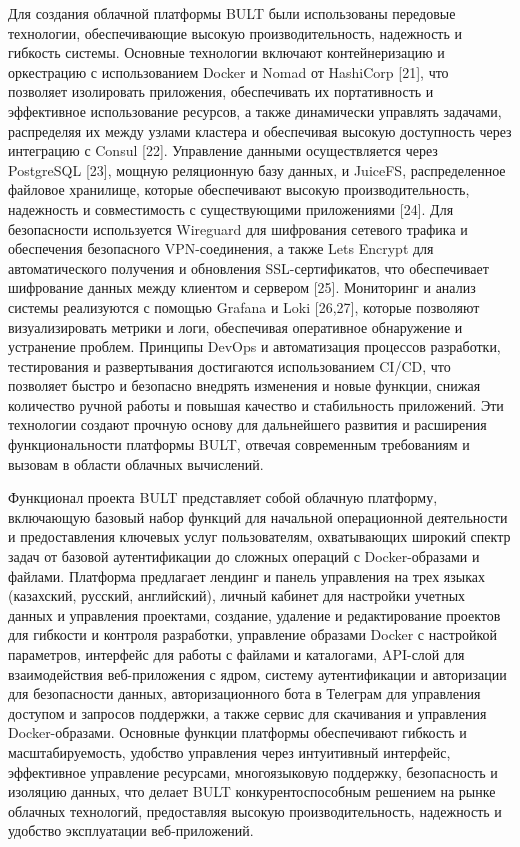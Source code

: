 \documentclass[
]{article}
\begin{document}
Для создания облачной платформы BULT были использованы передовые
технологии, обеспечивающие высокую производительность, надежность и
гибкость системы. Основные технологии включают контейнеризацию и
оркестрацию с использованием Docker и Nomad от HashiCorp {[}21{]}, что
позволяет изолировать приложения, обеспечивать их портативность и
эффективное использование ресурсов, а также динамически управлять
задачами, распределяя их между узлами кластера и обеспечивая высокую
доступность через интеграцию с Consul {[}22{]}. Управление данными
осуществляется через PostgreSQL {[}23{]}, мощную реляционную базу
данных, и JuiceFS, распределенное файловое хранилище, которые
обеспечивают высокую производительность, надежность и совместимость с
существующими приложениями {[}24{]}. Для безопасности используется
Wireguard для шифрования сетевого трафика и обеспечения безопасного
VPN-соединения, а также Let\textquotesingle s Encrypt для
автоматического получения и обновления SSL-сертификатов, что
обеспечивает шифрование данных между клиентом и сервером {[}25{]}.
Мониторинг и анализ системы реализуются с помощью Grafana и Loki
{[}26,27{]}, которые позволяют визуализировать метрики и логи,
обеспечивая оперативное обнаружение и устранение проблем. Принципы
DevOps и автоматизация процессов разработки, тестирования и
развертывания достигаются использованием CI/CD, что позволяет быстро и
безопасно внедрять изменения и новые функции, снижая количество ручной
работы и повышая качество и стабильность приложений. Эти технологии
создают прочную основу для дальнейшего развития и расширения
функциональности платформы BULT, отвечая современным требованиям и
вызовам в области облачных вычислений.

Функционал проекта BULT представляет собой облачную платформу,
включающую базовый набор функций для начальной операционной деятельности
и предоставления ключевых услуг пользователям, охватывающих широкий
спектр задач от базовой аутентификации до сложных операций с
Docker-образами и файлами. Платформа предлагает лендинг и панель
управления на трех языках (казахский, русский, английский), личный
кабинет для настройки учетных данных и управления проектами, создание,
удаление и редактирование проектов для гибкости и контроля разработки,
управление образами Docker с настройкой параметров, интерфейс для работы
с файлами и каталогами, API-слой для взаимодействия веб-приложения с
ядром, систему аутентификации и авторизации для безопасности данных,
авторизационного бота в Телеграм для управления доступом и запросов
поддержки, а также сервис для скачивания и управления Docker-образами.
Основные функции платформы обеспечивают гибкость и масштабируемость,
удобство управления через интуитивный интерфейс, эффективное управление
ресурсами, многоязыковую поддержку, безопасность и изоляцию данных, что
делает BULT конкурентоспособным решением на рынке облачных технологий,
предоставляя высокую производительность, надежность и удобство
эксплуатации веб-приложений.
\end{document}
